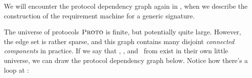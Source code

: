 \documentclass[../generics]{subfiles}
\begin{document}
We will encounter the protocol dependency graph again in , when we describe the construction of the requirement machine for a generic signature.

\begin{example}
The universe of protocols $\textsc{Proto}$ is finite, but potentially quite large. However, the edge set is rather sparse, and this graph contains many disjoint \emph{connected components} in practice. If we say that \tCollection, \tSequence, and \tIterator\ from  exist in their own little universe, we can draw the protocol dependency graph below. Notice how there's a loop at \tCollection:
\begin{center}
\end{center}
\end{example}
\end{document}
